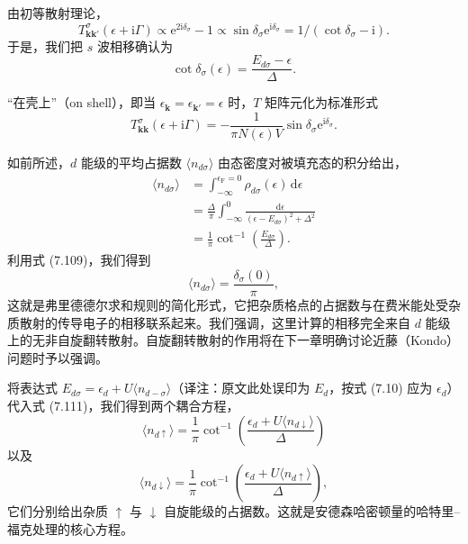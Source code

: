 由初等散射理论，
\begin{equation*}
T^{\sigma}_{\mathbf{k}\mathbf{k}'}(\epsilon + \mathrm{i}\Gamma) \propto \mathrm{e}^{2\mathrm{i}\delta_{\sigma}} - 1 \propto \sin\delta_{\sigma}\mathrm{e}^{\mathrm{i}\delta_{\sigma}} = 1/(\cot\delta_{\sigma} - \mathrm{i}).
\tag{7.108}
\end{equation*}
于是，我们把 $s$ 波相移确认为
\begin{equation*}
\cot\delta_{\sigma}(\epsilon) = \frac{E_{d\sigma} - \epsilon}{\Delta}.
\tag{7.109}
\end{equation*}

“在壳上”（on shell），即当 $\epsilon_{\mathbf{k}} = \epsilon_{\mathbf{k}'} = \epsilon$ 时，$T$ 矩阵元化为标准形式
\begin{equation*}
T^{\sigma}_{\mathbf{k}\mathbf{k}}(\epsilon + \mathrm{i}\Gamma) = -\frac{1}{\pi N(\epsilon)V}\sin\delta_{\sigma}\mathrm{e}^{\mathrm{i}\delta_{\sigma}}.
\tag{7.110}
\end{equation*}

如前所述，$d$ 能级的平均占据数 $\langle n_{d\sigma}\rangle$ 由态密度对被填充态的积分给出，
\begin{align*}
\langle n_{d\sigma}\rangle &= \int_{-\infty}^{\epsilon_{\mathrm{F}}=0}\rho_{d\sigma}(\epsilon)\,\mathrm{d}\epsilon \\
&= \frac{\Delta}{\pi}\int_{-\infty}^{0}\frac{\mathrm{d}\epsilon}{(\epsilon - E_{d\sigma})^{2} + \Delta^{2}} \\
&= \frac{1}{\pi}\cot^{-1}\left(\frac{E_{d\sigma}}{\Delta}\right).
\tag{7.111}
\end{align*}
利用式 (7.109)，我们得到
\begin{equation*}
\langle n_{d\sigma}\rangle = \frac{\delta_{\sigma}(0)}{\pi},
\tag{7.112}
\end{equation*}
这就是弗里德德尔求和规则的简化形式，它把杂质格点的占据数与在费米能处受杂质散射的传导电子的相移联系起来。我们强调，这里计算的相移完全来自 $d$ 能级上的无非自旋翻转散射。自旋翻转散射的作用将在下一章明确讨论近藤（Kondo）问题时予以强调。

将表达式 $E_{d\sigma} = \epsilon_{d} + U\langle n_{d-\sigma}\rangle$（译注：原文此处误印为 $E_d$，按式 (7.10) 应为 $\epsilon_d$）代入式 (7.111)，我们得到两个耦合方程，
\begin{equation*}
\langle n_{d\uparrow}\rangle = \frac{1}{\pi}\cot^{-1}\left(\frac{\epsilon_{d} + U\langle n_{d\downarrow}\rangle}{\Delta}\right)
\tag{7.113}
\end{equation*}
以及
\begin{equation*}
\langle n_{d\downarrow}\rangle = \frac{1}{\pi}\cot^{-1}\left(\frac{\epsilon_{d} + U\langle n_{d\uparrow}\rangle}{\Delta}\right),
\tag{7.114}
\end{equation*}
它们分别给出杂质 $\uparrow$ 与 $\downarrow$ 自旋能级的占据数。这就是安德森哈密顿量的哈特里–福克处理的核心方程。

